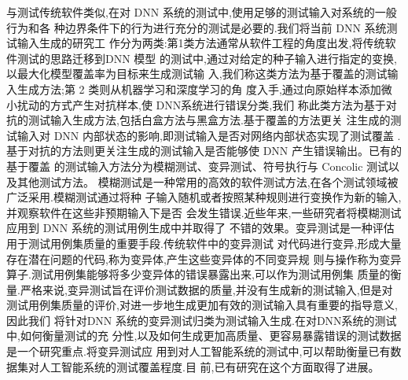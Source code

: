 与测试传统软件类似,在对 DNN 系统的测试中,使用足够的测试输入对系统的一般行为和各
种边界条件下的行为进行充分的测试是必要的.我们将当前 DNN 系统测试输入生成的研究工
作分为两类:第1类方法通常从软件工程的角度出发,将传统软件测试的思路迁移到DNN 模型
的测试中,通过对给定的种子输入进行指定的变换,以最大化模型覆盖率为目标来生成测试输
入,我们称这类方法为基于覆盖的测试输入生成方法;第 2 类则从机器学习和深度学习的角
度入手,通过向原始样本添加微小扰动的方式产生对抗样本,使 DNN系统进行错误分类,我们
称此类方法为基于对抗的测试输入生成方法,包括白盒方法与黑盒方法.基于覆盖的方法更关
注生成的测试输入对 DNN 内部状态的影响,即测试输入是否对网络内部状态实现了测试覆盖
.基于对抗的方法则更关注生成的测试输入是否能够使 DNN 产生错误输出。已有的基于覆盖
的测试输入方法分为模糊测试、变异测试、符号执行与 Concolic 测试以及其他测试方法。
模糊测试是一种常用的高效的软件测试方法,在各个测试领域被广泛采用.模糊测试通过将种
子输入随机或者按照某种规则进行变换作为新的输入,并观察软件在这些非预期输入下是否
会发生错误.近些年来,一些研究者将模糊测试应用到 DNN 系统的测试用例生成中并取得了
不错的效果。变异测试是一种评估用于测试用例集质量的重要手段.传统软件中的变异测试
对代码进行变异,形成大量存在潜在问题的代码,称为变异体,产生这些变异体的不同变异规
则与操作称为变异算子.测试用例集能够将多少变异体的错误暴露出来,可以作为测试用例集
质量的衡量.严格来说,变异测试旨在评价测试数据的质量,并没有生成新的测试输入,但是对
测试用例集质量的评价,对进一步地生成更加有效的测试输入具有重要的指导意义,因此我们
将针对DNN 系统的变异测试归类为测试输入生成.在对DNN系统的测试中,如何衡量测试的充
分性,以及如何生成更加高质量、更容易暴露错误的测试数据是一个研究重点.将变异测试应
用到对人工智能系统的测试中,可以帮助衡量已有数据集对人工智能系统的测试覆盖程度.目
前,已有研究在这个方面取得了进展。

